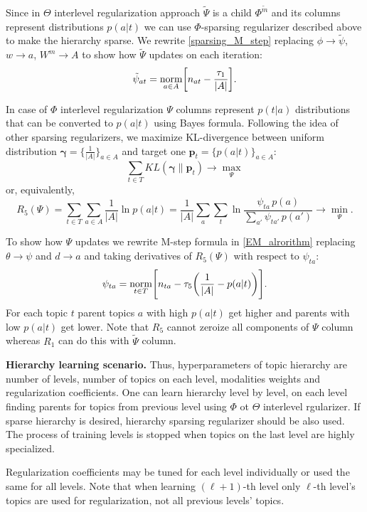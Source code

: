 \documentclass[12pt, twoside]{article}
\begin{document}
Since in $\Theta$ interlevel regularization approach $\widetilde \Psi$ is a child $\Phi^{\tilde m}$ and its columns represent distributions $p(a|t)$ we can use $\Phi$-sparsing regularizer described above to make the hierarchy sparse.
We rewrite \eqref{sparsing_M_step} replacing $\phi \rightarrow \tilde \psi$, $w \rightarrow a$, $W^m \rightarrow A$ to show how $\widetilde \Psi$ updates on each iteration:
\[
\tilde \psi_{at} = \mathop{\text{norm}}\limits_{a \in A} \biggl[n_{at} - \frac {\tau_1} {|A|}\biggr].
\]

In case of $\Phi$ interlevel regularization $\Psi$ columns represent $p(t|a)$ distributions that can be converted to $p(a|t)$ using Bayes formula. Following the idea of other sparsing regularizers, we maximize KL-divergence between uniform distribution $\bm \gamma = \{\frac 1 {|A|}\}_{a \in A}$ and target one $\bm p_t = \{p(a|t)\}_{a \in A}$:
\[
\sum_{t \in T} KL(\bm \gamma \| \bm p_t) \rightarrow \max_{\Psi} 
\]
or, equivalently,
\[
R_5(\Psi) = \sum_{t \in T} \sum_{a \in A} \frac 1 {|A|} \ln p(a|t) = 
 \frac 1 {|A|} \sum_a \sum_t \ln \frac{\psi_{ta} \, p(a)} {\sum_{a'} \psi_{ta'} \, p(a')} \rightarrow \min_{\Psi}.
\]

To show how $\Psi$ updates we rewrite M-step formula in \eqref{EM_alrorithm} replacing $\theta \rightarrow \psi$ and $d \rightarrow a$ and taking derivatives of $R_5(\Psi)$ with respect to $\psi_{ta}$:
\[
\psi_{ta} = \mathop{\text{norm}}\limits_{t \in T} \Biggl[n_{ta} - \tau_5 \biggl( \frac {1} {|A|} - p(a|t) \biggr)\Biggr].
\]
For each topic $t$ parent topics $a$ with high $p(a|t)$ get higher and parents with low $p(a|t)$ get lower. Note that $R_5$ cannot zeroize all components of $\Psi$ column whereas $R_1$ can do this with $\widetilde \Psi$ column.

\vspace{0.5cm}
\textbf{Hierarchy learning scenario.}
Thus, hyperparameters of topic hierarchy are number of levels, number of topics on each level, modalities weights and regularization coefficients.
One can learn hierarchy level by level, on each level finding parents for topics from previous level using $\Phi$ ot $\Theta$ interlevel rgularizer. If sparse hierarchy is desired, hierarchy sparsing regularizer should be also used. The process of training levels is stopped when topics on the last level are highly specialized. 

Regularization coefficients may be tuned for each level individually or used the same for all levels.
Note that when learning $(\ell+1)$-th level only $\ell$-th level's topics are used for regularization, not all previous levels' topics.
\end{document}
